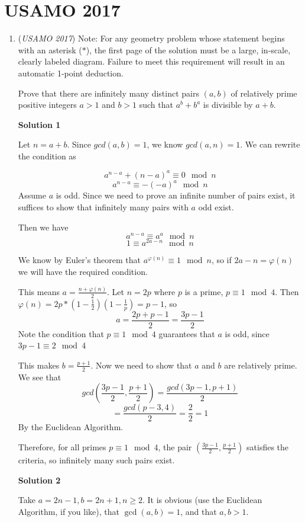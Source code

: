 \section{USAMO 2017}
        \begin{enumerate}
        	\item (\textit{USAMO 2017}) Note: For any geometry problem whose statement begins with an asterisk ($*$), the first page of the solution must be a large, in-scale, clearly labeled diagram. Failure to meet this requirement will result in an automatic 1-point deduction. 


 Prove that there are infinitely many distinct pairs $(a,b)$ of relatively prime positive integers $a > 1$ and $b > 1$ such that $a^b + b^a$ is divisible by $a + b.$




\textbf{Solution 1}

Let $n=a+b$. Since $gcd(a,b)=1$, we know $gcd(a,n)=1$. We can rewrite the condition as 

 
 \[a^{n-a}+(n-a)^a \equiv 0 \mod{n}\]
 \[a^{n-a}\equiv-(-a)^a \mod{n}\]Assume $a$ is odd. Since we need to prove an infinite number of pairs exist, it suffices to show that infinitely many pairs with $a$ odd exist.

 Then we have 
 \[a^{n-a}\equiv a^a \mod{n}\]
 \[1 \equiv a^{2a-n} \mod{n}\]

 We know by Euler's theorem that $a^{\varphi(n)} \equiv 1 \mod{n}$, so if $2a-n=\varphi(n)$ we will have the required condition.

 This means $a=\frac{n+\varphi(n)}{2}$. Let $n=2p$ where $p$ is a prime, $p\equiv 1\mod{4}$. Then $\varphi(n) = 2p*\left(1-\frac{1}{2}\right)\left(1-\frac{1}{p}\right) = p-1$, so 
 \[a = \frac{2p+p-1}{2} = \frac{3p-1}{2}\]Note the condition that $p\equiv 1\mod{4}$ guarantees that $a$ is odd, since $3p-1 \equiv 2\mod{4}$

 This makes $b = \frac{p+1}{2}$. Now we need to show that $a$ and $b$ are relatively prime. We see that
 \[gcd\left(\frac{3p-1}{2},\frac{p+1}2\right)=\frac{gcd(3p-1,p+1)}{2}\]
 \[=\frac{gcd(p-3,4)}{2}=\frac22=1\]By the Euclidean Algorithm.

 Therefore, for all primes $p \equiv 1\mod{4}$, the pair $\left(\frac{3p-1}{2},\frac{p+1}{2}\right)$ satisfies the criteria, so infinitely many such pairs exist.

 



\textbf{Solution 2}

Take $a=2n-1, b=2n+1, n\geq 2$. It is obvious (use the Euclidean Algorithm, if you like), that $\gcd(a,b)=1$, and that $a,b>1$.


\end{enumerate}
